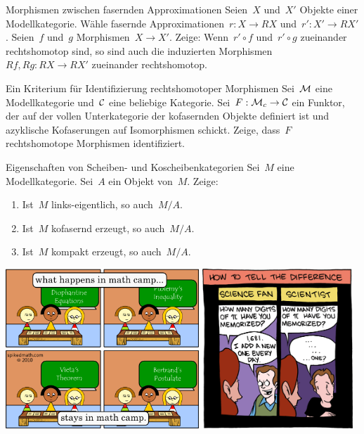 \documentclass{uebblatt}
\begin{document}

\begin{aufgabe}{Morphismen zwischen fasernden Approximationen}
Seien~$X$ und~$X'$ Objekte einer Modellkategorie. Wähle fasernde
Approximationen~$r : X \to RX$ und~$r' : X' \to RX'$. Seien~$f$ und~$g$
Morphismen~$X \to X'$. Zeige: Wenn~$r' \circ f$ und~$r' \circ g$ zueinander
rechtshomotop sind, so sind auch die induzierten Morphismen~$Rf, Rg : RX \to
RX'$ zueinander rechtshomotop.
\end{aufgabe}

\begin{aufgabe}{Ein Kriterium für Identifizierung rechtshomotoper Morphismen}
Sei~$\mathcal{M}$ eine Modellkategorie und~$\mathcal{C}$ eine beliebige Kategorie. Sei~$F : \mathcal{M}_c
\to \mathcal{C}$ ein Funktor, der auf der vollen Unterkategorie der kofasernden Objekte
definiert ist und azyklische Kofaserungen auf Isomorphismen schickt.
Zeige, dass~$F$ rechtshomotope Morphismen identifiziert.
\end{aufgabe}

\begin{aufgabe}{Eigenschaften von Scheiben- und Koscheibenkategorien}
Sei~$M$ eine Modellkategorie. Sei~$A$ ein Objekt von~$M$. Zeige:
\begin{enumerate}
\item Ist~$M$ links-eigentlich, so auch~$M/A$.
\item Ist~$M$ kofasernd erzeugt, so auch~$M/A$.
\item Ist~$M$ kompakt erzeugt, so auch~$M/A$.
\end{enumerate}
\end{aufgabe}

\vfill
\centering
\href{http://spikedmath.com/182.html}{\includegraphics[height=6cm]{images/what-happens-in-math-camp}}
\quad
\href{http://smbc-comics.com/index.php?id=1777}{\includegraphics[height=6cm]{images/memorizing-pi}}
\par
\end{document}
